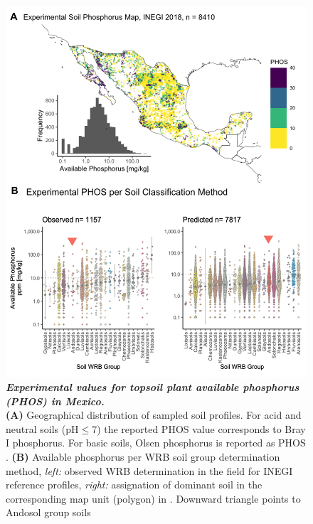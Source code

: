 \begin{figure}[!ht]
\centering
\includegraphics[width=0.65\paperwidth]{Chapter-2/figs/obeserved_PHOS.png}
\caption[Experimental values for topsoil plant available phosphorus (PHOS) in Mexico]{\textit{\textbf{Experimental values for topsoil plant available phosphorus (PHOS) in Mexico.}} \\\hspace{\textwidth} 
\textbf{(A)} Geographical distribution of sampled soil profiles. For acid and neutral soils ($\text{pH} \leq 7$) the reported PHOS value corresponds to Bray I phosphorus. For basic soils, Olsen phosphorus is reported as PHOS \citep{paz-pellat2018}.
\textbf{(B)} Available phosphorus per WRB soil group determination method, \textit{left:} observed WRB determination in the field for INEGI reference profiles, \textit{right:} assignation of dominant soil in the corresponding map unit (polygon) in \citep{inegi2013}. Downward triangle points to Andosol group soils}
\label{fig::WRB_inegi2013map}
\end{figure}
\clearpage

